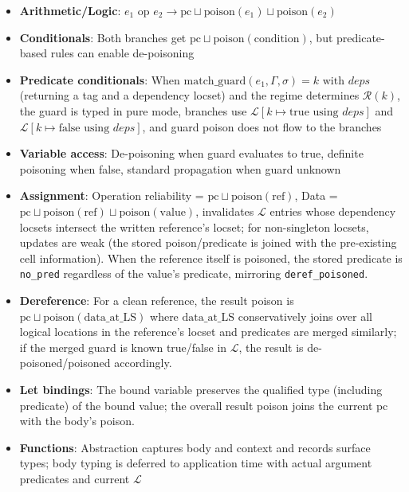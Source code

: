 \documentclass[12pt]{article}
\begin{document}
\begin{itemize}
    \item \textbf{Arithmetic/Logic}: $e_1 \text{ op } e_2 \rightarrow \text{pc} \sqcup \text{poison}(e_1) \sqcup \text{poison}(e_2)$
    \item \textbf{Conditionals}: Both branches get $\text{pc} \sqcup \text{poison}(\text{condition})$, but predicate-based rules can enable de-poisoning
    \item \textbf{Predicate conditionals}: When $\text{match\_guard}(e_1, \Gamma, \sigma) = k \text{ with } deps$ (returning a tag and a dependency locset) and the regime determines $\mathcal{R}(k)$, the guard is typed in pure mode, branches use $\mathcal{L}[k \mapsto \text{true using } deps]$ and $\mathcal{L}[k \mapsto \text{false using } deps]$, and guard poison does not flow to the branches
    \item \textbf{Variable access}: De-poisoning when guard evaluates to true, definite poisoning when false, standard propagation when guard unknown
    \item \textbf{Assignment}: Operation reliability = $\text{pc} \sqcup \text{poison}(\text{ref})$, Data = $\text{pc} \sqcup \text{poison}(\text{ref}) \sqcup \text{poison}(\text{value})$, invalidates $\mathcal{L}$ entries whose dependency locsets intersect the written reference's locset; for non-singleton locsets, updates are weak (the stored poison/predicate is joined with the pre-existing cell information). When the reference itself is poisoned, the stored predicate is \texttt{no\_pred} regardless of the value's predicate, mirroring \texttt{deref\_poisoned}.
    \item \textbf{Dereference}: For a clean reference, the result poison is $\text{pc} \sqcup \text{poison}(\text{data\_at\_LS})$ where $\text{data\_at\_LS}$ conservatively joins over all logical locations in the reference's locset and predicates are merged similarly; if the merged guard is known true/false in $\mathcal{L}$, the result is de-poisoned/poisoned accordingly.
    \item \textbf{Let bindings}: The bound variable preserves the qualified type (including predicate) of the bound value; the overall result poison joins the current $\text{pc}$ with the body's poison.
    \item \textbf{Functions}: Abstraction captures body and context and records
    surface types; body typing is deferred to application time with actual
    argument predicates and current $\mathcal{L}$
\end{itemize}
\end{document}
